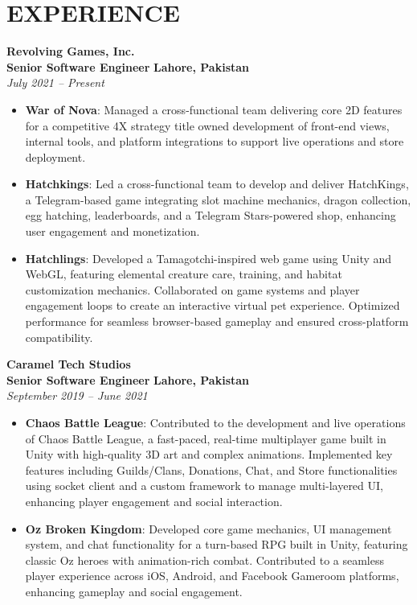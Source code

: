 \documentclass[11pt]{article}
\begin{document}
\section*{EXPERIENCE}
\textbf{Revolving Games, Inc.} \\
\textbf{Senior Software Engineer} \hfill \textbf{Lahore, Pakistan} \\
\textit{July 2021 -- Present}
\begin{itemize}
	\item \textbf{War of Nova}: Managed a cross-functional team delivering core 2D features for a competitive 4X strategy title owned development of front-end views, internal tools, and platform integrations to support live operations and store deployment.
	\item \textbf{Hatchkings}: Led a cross-functional team to develop and deliver HatchKings, a Telegram-based game integrating slot machine mechanics, dragon collection, egg hatching, leaderboards, and a Telegram Stars-powered shop, enhancing user engagement and monetization.
	\item \textbf{Hatchlings}: Developed a Tamagotchi-inspired web game using Unity and WebGL, featuring elemental creature care, training, and habitat customization mechanics. Collaborated on game systems and player engagement loops to create an interactive virtual pet experience. Optimized performance for seamless browser-based gameplay and ensured cross-platform compatibility.
\end{itemize}
\textbf{Caramel Tech Studios} \\
\textbf{Senior Software Engineer} \hfill \textbf{Lahore, Pakistan} \\
\textit{September 2019 -- June 2021}
\begin{itemize}
	\item \textbf{Chaos Battle League}: Contributed to the development and live operations of Chaos Battle League, a fast-paced, real-time multiplayer game built in Unity with high-quality 3D art and complex animations. Implemented key features including Guilds/Clans, Donations, Chat, and Store functionalities using socket client and a custom framework to manage multi-layered UI, enhancing player engagement and social interaction.
	\item \textbf{Oz Broken Kingdom}: Developed core game mechanics, UI management system, and chat functionality for a turn-based RPG built in Unity, featuring classic Oz heroes with animation-rich combat. Contributed to a seamless player experience across iOS, Android, and Facebook Gameroom platforms, enhancing gameplay and social engagement.
\end{itemize}
\end{document}
